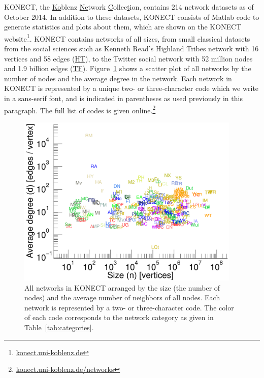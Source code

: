 \documentclass{article}
\newcommand{\wFull}{0.95\textwidth}
\begin{document}
KONECT, the \underline{Ko}blenz \underline{Ne}twork \underline
Collec\underline tion, contains 214 network datasets as of October 2014.
In addition to these datasets, KONECT consists of Matlab code to
generate statistics and plots about them, which are shown on the
KONECT
website\footnote{\href{http://konect.uni-koblenz.de/}{konect.uni-koblenz.de}}.
KONECT contains networks of all sizes, from small classical datasets
from the social sciences such as Kenneth Read's Highland Tribes network
with 16 vertices and 58 edges
(\href{http://konect.uni-koblenz.de/networks/ucidata-gama}{\textsf{HT}}),
to the Twitter social network with 52 million nodes and 1.9 billion
edges
(\href{http://konect.uni-koblenz.de/networks/twitter_mpi}{\textsf{TF}}).
Figure~\ref{fig:scatter.size.avgdegree} shows a scatter plot of all
networks by the number of nodes and the average degree in the network.
Each network in KONECT is represented by a unique two- or
three-character code which we write in a \textsf{sans-serif font}, and
is indicated in parentheses as used previously in this paragraph. The
full list of codes is given
online.\footnote{\href{http://konect.uni-koblenz.de/networks}{konect.uni-koblenz.de/networks}}

\begin{figure}
  \centering
  \includegraphics[width=\wFull]{plot/scatter.c.size.avgdegree.28}
  \caption[*]{
    All networks in KONECT
    arranged by the size (the number of nodes) and the
    average number of neighbors of all nodes.  Each network is
    represented by a two- or three-character code. The color of each
    code corresponds to the network 
    category as given in Table~\ref{tab:categories}.  
  }
  \label{fig:scatter.size.avgdegree}
\end{figure}
\end{document}
